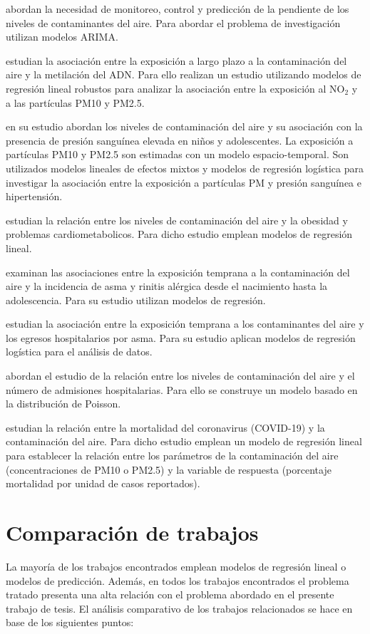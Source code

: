 \citet{r13} abordan la necesidad de monitoreo, control y predicción de la pendiente de los niveles de contaminantes del aire. Para abordar el problema de investigación utilizan modelos ARIMA. 

\citet{r14} estudian la asociación entre la exposición a largo plazo a la contaminación del aire y la metilación del ADN. Para ello realizan un estudio utilizando modelos de regresión lineal robustos para analizar la asociación entre la exposición al NO$_2$ y a las partículas PM10 y PM2.5.

\citet{r15} en su estudio abordan los niveles de contaminación del aire y su asociación con la presencia de presión sanguínea elevada en niños y adolescentes. La exposición a partículas PM10 y PM2.5 son estimadas con un modelo espacio-temporal. Son utilizados modelos lineales de efectos mixtos y modelos de regresión logística para investigar la asociación entre la exposición a partículas PM y presión sanguínea e hipertensión. 

\citet{r16} estudian la relación entre los niveles de contaminación del aire y la obesidad y problemas cardiometabolicos. Para dicho estudio emplean modelos de regresión lineal.

\citet{r17} examinan las asociaciones entre la exposición temprana a la contaminación del aire y la incidencia de asma y rinitis alérgica desde el nacimiento hasta la adolescencia. Para su estudio utilizan modelos de regresión.

\citet{r18} estudian la asociación entre la exposición temprana a los contaminantes del aire y los egresos hospitalarios por asma. Para su estudio aplican modelos de regresión logística para el análisis de datos. 

\citet{r19} abordan el estudio de la relación entre los niveles de contaminación del aire y el número de admisiones hospitalarias. Para ello se construye un modelo basado en la distribución de Poisson.

\citet{r20} estudian la relación entre la mortalidad del coronavirus (COVID-19) y la contaminación del aire. Para dicho estudio emplean un modelo de regresión lineal para establecer la relación entre los parámetros de la contaminación del aire (concentraciones de PM10 o PM2.5) y la variable de respuesta (porcentaje
mortalidad por unidad de casos reportados).
\clearpage

\section{Comparación de trabajos}
La mayoría de los trabajos encontrados emplean modelos de regresión lineal o modelos de predicción. Además, en todos los trabajos encontrados el problema tratado presenta una alta relación con el problema abordado en el presente trabajo de tesis. El análisis comparativo de los trabajos relacionados se hace en base de los siguientes puntos:

